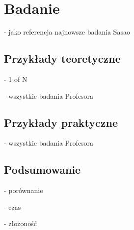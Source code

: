 \chapter{Badanie}
- jako referencja najnowsze badania Sasao
\section{Przykłady teoretyczne}
- 1 of N

- wszystkie badania Profesora
\section{Przykłady praktyczne}
- wszystkie badania Profesora
\section{Podsumowanie}
- porównanie

- czas

- złożoność
